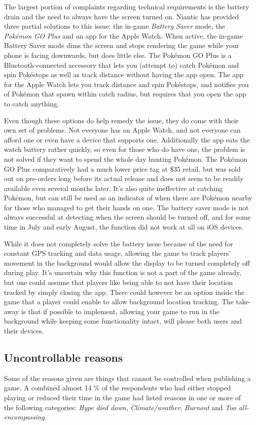 The largest portion of complaints regarding technical requirements is the battery drain and the need to always have the screen turned on. Niantic has provided three partial solutions to this issue: the in-game \emph{Battery Saver} mode, the \emph{Pokémon GO Plus} and an app for the Apple Watch. When active, the in-game Battery Saver mode dims the screen and stops rendering the game while your phone is facing downwards, but does little else. The Pokémon GO Plus is a Bluetooth-connected accessory that lets you (attempt to) catch Pokémon and spin Pokéstops as well as track distance without having the app open. The app for the Apple Watch lets you track distance and spin Pokéstops, and notifies you of Pokémon that spawn within catch radius, but requires that you open the app to catch anything.

Even though these options do help remedy the issue, they do come with their own set of problems. Not everyone has an Apple Watch, and not everyone can afford one or even have a device that supports one. Additionally the app eats the watch battery rather quickly, so even for those who do have one, the problem is not solved if they want to spend the whole day hunting Pokémon. The Pokémon GO Plus comparatively had a much lower price tag at \$35 retail, but was sold out on pre-orders long before its actual release and does not seem to be readily available even several months later. It's also quite ineffective at catching Pokémon, but can still be used as an indicator of when there are Pokémon nearby for those who managed to get their hands on one. The battery saver mode is not always successful at detecting when the screen should be turned off, and for some time in July and early August, the function did not work at all on iOS devices.

While it does not completely solve the battery issue because of the need for constant GPS tracking and data usage, allowing the game to track players' movement in the background would allow the display to be turned completely off during play. It's uncertain why this function is not a part of the game already, but one could assume that players like being able to not have their location tracked by simply closing the app. There could however be an option inside the game that a player could enable to allow background location tracking. The take-away is that if possible to implement, allowing your game to run in the background while keeping some functionality intact, will please both users and their devices.

\subsection{Uncontrollable reasons}
Some of the reasons given are things that cannot be controlled when publishing a game. A combined almost 14 \% of the respondents who had either stopped playing or reduced their time in the game had listed reasons in one or more of the following categories: \emph{Hype died down}, \emph{Climate/weather}, \emph{Burnout} and \emph{Too all-encompassing}.

